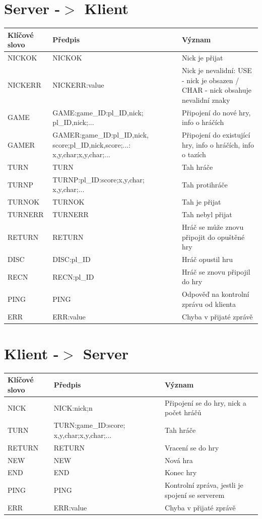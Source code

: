 \section{Server -$>$ Klient}
\begin{tabular}{|l|p{5.1cm}|p{5cm}|}
\hline
Klíčové slovo & Předpis & Význam \\ \hline
NICKOK	& NICKOK	& Nick je přijat \\ \hline
NICKERR	& NICKERR:value	& Nick je nevalidní: USE - nick je obsazen / CHAR - nick obsahuje nevalidní znaky \\ \hline
GAME	& GAME:game\_ID:pl\_ID,nick; pl\_ID,nick;...	& Připojení do nové hry, info o hráčích \\ \hline
GAMER	& GAMER:game\_ID:pl\_ID,nick, score;pl\_ID,nick,score;...: x,y,char;x,y,char;...	& Připojení do existující hry, info o hráčích, info o tazích \\ \hline
TURN	& TURN	& Tah hráče \\ \hline
TURNP	& TURNP:pl\_ID:score;x,y,char; x,y,char;...	& Tah protihráče \\ \hline
TURNOK	& TURNOK	& Tah je přijat \\ \hline
TURNERR	& TURNERR	& Tah nebyl přijat \\ \hline
RETURN	& RETURN	& Hráč se může znovu připojit do opuštěné hry \\ \hline
DISC	& DISC:pl\_ID	& Hráč opustil hru \\ \hline
RECN	& RECN:pl\_ID	& Hráč se znovu připojil do hry \\ \hline
PING	& PING	& Odpověď na kontrolní zprávu od klienta \\ \hline
ERR	& ERR:value	& Chyba v přijaté zprávě \\ \hline
\end{tabular}

\section{Klient -$>$ Server}
\begin{tabular}{|l|p{5cm}|p{5cm}|}
\hline
Klíčové slovo & Předpis & Význam \\ \hline
NICK	& NICK:nick;n	& Připojení se do hry, nick a počet hráčů \\ \hline
TURN	& TURN:game\_ID:score; x,y,char;x,y,char;...	& Tah hráče \\ \hline
RETURN& RETURN 	& Vracení se do hry \\ \hline
NEW		& NEW	& Nová hra \\ \hline
END		& END	& Konec hry \\ \hline
PING	& PING	& Kontrolní zpráva, jestli je spojení se serverem \\ \hline
ERR		& ERR:value	& Chyba v přijaté zprávě \\ \hline
\end{tabular}



